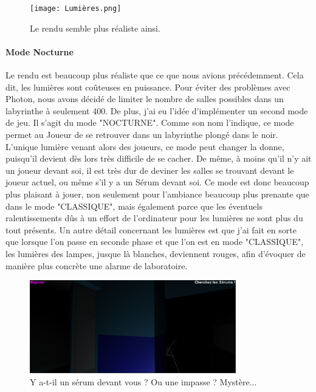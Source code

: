 \documentclass{article}
\begin{document}
\begin{figure}[H]
    \centering
    \texttt{[image: Lumières.png]}
    \caption{Le rendu semble plus réaliste ainsi.}
    \label{Le rendu semble plus réaliste ainsi.}
\end{figure}

\paragraph{Mode Nocturne}
Le rendu est beaucoup plus réaliste que ce que nous avions précédemment. Cela dit, les lumières sont coûteuses en puissance. Pour éviter des problèmes avec Photon, nous avons décidé de limiter le nombre de salles possibles dans un labyrinthe à seulement 400. De plus, j'ai eu l'idée d'implémenter un second mode de jeu. Il s'agit du mode "NOCTURNE". Comme son nom l'indique, ce mode permet au Joueur de se retrouver dans un labyrinthe plongé dans le noir. L'unique lumière venant alors des joueurs, ce mode peut changer la donne, puisqu'il devient dès lors très difficile de se cacher. De même, à moins qu'il n'y ait un joueur devant soi, il est très dur de deviner les salles se trouvant devant le joueur actuel, ou même s'il y a un Sérum devant soi. Ce mode est donc beaucoup plus plaisant à jouer, non seulement pour l'ambiance beaucoup plus prenante que dans le mode "CLASSIQUE", mais également parce que les éventuels ralentissements dûs à un effort de l'ordinateur pour les lumières ne sont plus du tout présents. Un autre détail concernant les lumières est que j'ai fait en sorte que lorsque l'on passe en seconde phase et que l'on est en mode "CLASSIQUE", les lumières des lampes, jusque là blanches, deviennent rouges, afin d'évoquer de manière plus concrète une alarme de laboratoire.

\begin{figure}[H]
    \centering
    \includegraphics[width=0.8\textwidth]{Nocturne.png}
    \caption{Y a-t-il un sérum devant vous ? Ou une impasse ? Mystère...}
    \label{Y a-t-il un sérum devant vous ? Ou une impasse ? Mystère...}
\end{figure}
\end{document}
